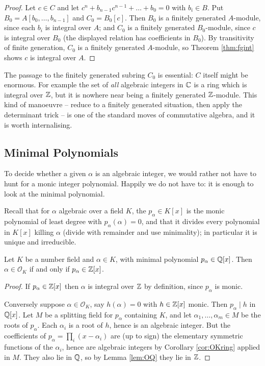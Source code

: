 \documentclass[a4paper]{scrartcl}
\renewcommand{\OO}{\mathcal{O}}
\begin{document}
\begin{proof}
	Let $c \in C$ and let $c^n + b_{n-1}c^{n-1} + \dots + b_0 = 0$ with $b_i \in B$. Put $B_0 = A[b_0, \dots, b_{n-1}]$ and $C_0 = B_0[c]$. Then $B_0$ is a finitely generated $A$-module, since each $b_i$ is integral over $A$; and $C_0$ is a finitely generated $B_0$-module, since $c$ is integral over $B_0$ (the displayed relation has coefficients in $B_0$). By transitivity of finite generation, $C_0$ is a finitely generated $A$-module, so Theorem \ref{thm:fgint} shows $c$ is integral over $A$.
\end{proof}

\begin{remark}
	The passage to the finitely generated subring $C_0$ is essential: $C$ itself might be enormous. For example the set of \emph{all} algebraic integers in $\mathbb{C}$ is a ring which is integral over $\mathbb{Z}$, but it is nowhere near being a finitely generated $\mathbb{Z}$-module. This kind of manoeuvre -- reduce to a finitely generated situation, then apply the determinant trick -- is one of the standard moves of commutative algebra, and it is worth internalising.
\end{remark}

\subsection{Minimal Polynomials}

To decide whether a given $\alpha$ is an algebraic integer, we would rather not have to hunt for a monic integer polynomial. Happily we do not have to: it is enough to look at the minimal polynomial.

Recall that for $\alpha$ algebraic over a field $K$, the  $p_\alpha \in K[x]$ is the monic polynomial of least degree with $p_\alpha(\alpha) = 0$, and that it divides every polynomial in $K[x]$ killing $\alpha$ (divide with remainder and use minimality); in particular it is unique and irreducible.

\begin{proposition}\label{prop:minpolyZ}
	Let $K$ be a number field and $\alpha \in K$, with minimal polynomial $p_\alpha \in \mathbb{Q}[x]$. Then $\alpha \in \OO_K$ if and only if $p_\alpha \in \mathbb{Z}[x]$.
\end{proposition}

\begin{proof}
	If $p_\alpha \in \mathbb{Z}[x]$ then $\alpha$ is integral over $\mathbb{Z}$ by definition, since $p_\alpha$ is monic.

	Conversely suppose $\alpha \in \OO_K$, say $h(\alpha) = 0$ with $h \in \mathbb{Z}[x]$ monic. Then $p_\alpha \mid h$ in $\mathbb{Q}[x]$. Let $M$ be a splitting field for $p_\alpha$ containing $K$, and let $\alpha_1, \dots, \alpha_m \in M$ be the roots of $p_\alpha$. Each $\alpha_i$ is a root of $h$, hence is an algebraic integer. But the coefficients of $p_\alpha = \prod_i (x - \alpha_i)$ are (up to sign) the elementary symmetric functions of the $\alpha_i$, hence are algebraic integers by Corollary \ref{cor:OKring} applied in $M$. They also lie in $\mathbb{Q}$, so by Lemma \ref{lem:OQ} they lie in $\mathbb{Z}$.
\end{proof}
\end{document}
